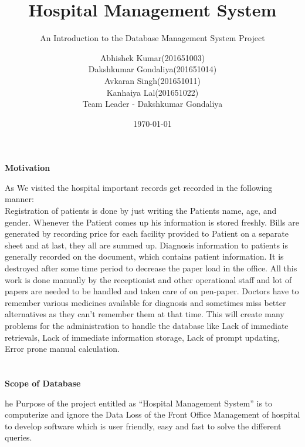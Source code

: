 \documentclass{turabian-researchpaper}
\title{\huge Hospital Management System}
\subtitle{\small An Introduction to the Database Management System Project}
\author{Abhishek Kumar(201651003)\\Dakshkumar Gondaliya(201651014)\\Avkaran Singh(201651011)\\Kanhaiya Lal(201651022)\\Team Leader - Dakshkumar Gondaliya}
\date{\today}
\begin{document}
\maketitle
\section{}
\begin{flushleft}
\textbf{\large Motivation}
\end{flushleft}
As We visited the hospital important records get recorded in the following manner:\\ Registration of patients is done by just writing the Patients name, age, and gender. Whenever the Patient comes up his information is stored freshly.  Bills are generated by recording price for each facility provided to Patient on a separate sheet and at last, they  all are summed up.  Diagnosis information to patients is generally recorded on the document, which contains patient information.  It is destroyed after some time period to decrease the paper load in the office. All this work is done manually by the receptionist and other operational staff and lot of papers are needed to be handled and taken care of on pen-paper.  Doctors have to remember various medicines available for diagnosis and sometimes miss better alternatives as they can't remember them at that time.  This will create many problems for the administration to handle the database like Lack  of immediate retrievals,  Lack  of immediate information storage, Lack of prompt updating, Error prone manual calculation. 
 
\vspace{1.5cm}
\section{}
\begin{flushleft}
\textbf{\large Scope of Database}
\end{flushleft}
he Purpose of  the project  entitled  as “Hospital  Management  System” is  to computerize and ignore the Data Loss of the Front Office Management of hospital to develop software which is user friendly, easy and fast to solve the different queries.

\vspace{1.5cm}
\end{document}
